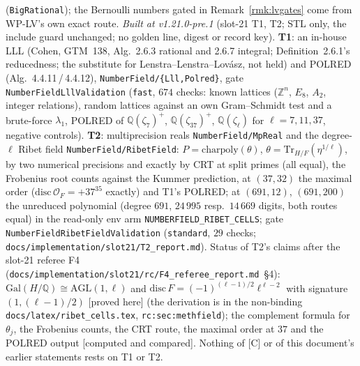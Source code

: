 \documentclass[11pt]{article}
\theoremstyle{remark}
\newcommand{\Z}{\mathbb{Z}}
\newcommand{\Q}{\mathbb{Q}}
\newcommand{\PROVED}{\textsf{[proved here]}}
\newcommand{\CMPD}{\textsf{[computed and compared]}}   %
\begin{document}
(\texttt{BigRational}); the Bernoulli numbers gated in Remark~\ref{rmk:lvgates} come from WP-LV's own exact route.
\emph{Built at v1.21.0-pre.1} (slot-21 T1, T2; STL only, the include guard unchanged; no golden line, digest or record key). \textbf{T1}: an in-house LLL (Cohen, GTM~138,
Alg.~2.6.3 rational and 2.6.7 integral; Definition~2.6.1's reducedness; the substitute for Lenstra--Lenstra--Lov\'asz, not held) and POLRED (Alg.~4.4.11\,/\,4.4.12), \texttt{NumberField/\{Lll,Polred\}},
gate \texttt{NumberFieldLllValidation} (\texttt{fast}, $674$ checks: known lattices ($\Z^{n}$, $E_8$, $A_2$, integer relations), random lattices against an own Gram--Schmidt test and a brute-force
$\lambda_1$, POLRED of $\Q(\zeta_7)^{+}$, $\Q(\zeta_{37})^{+}$, $\Q(\zeta_\ell)$ for $\ell=7,11,37$, negative controls). \textbf{T2}: multiprecision reals \texttt{NumberField/MpReal} and the
degree-$\ell$ Ribet field \texttt{NumberField/RibetField}: $P=\mathrm{charpoly}(\theta)$, $\theta=\mathrm{Tr}_{H/F}(\eta^{1/\ell})$, by two numerical precisions and exactly by CRT at split primes (all
equal), the Frobenius root counts against the Kummer prediction, at $(37,32)$ the maximal order ($\mathrm{disc}\,\mathcal O_F=+37^{35}$ exactly) and T1's POLRED; at $(691,12)$, $(691,200)$ the
unreduced polynomial (degree $691$, $24\,995$ resp.\ $14\,669$ digits, both routes equal) in the read-only env arm \texttt{NUMBERFIELD\_RIBET\_CELLS}; gate \texttt{NumberFieldRibetFieldValidation}
(\texttt{standard}, $29$ checks; \texttt{docs/implementation/slot21/T2\_report.md}). Status of T2's claims after the slot-21 referee F4 (\texttt{docs/implementation/slot21/rc/F4\_referee\_report.md}~\S4):
$\mathrm{Gal}(H/\Q)\cong\mathrm{AGL}(1,\ell)$ and $\mathrm{disc}\,F=(-1)^{(\ell-1)/2}\ell^{\ell-2}$ with signature $(1,(\ell-1)/2)$ \PROVED{} (the derivation is in the non-binding
\texttt{docs/latex/ribet\_cells.tex}, \texttt{rc:sec:methfield}); the complement formula for $\theta_j$, the Frobenius counts, the CRT route, the maximal order at $37$ and the POLRED output \CMPD. Nothing
of [C] or of this document's earlier statements rests on T1 or T2.
\end{document}
